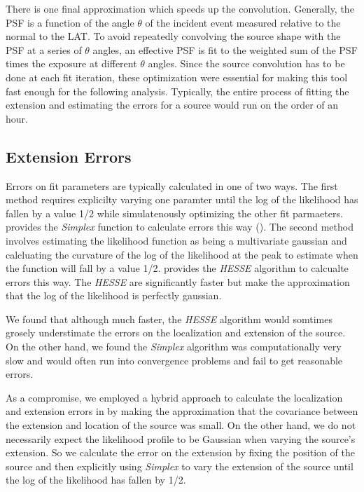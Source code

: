 \documentclass[preprint]{aastex}
\newcommand{\pointlike}{\text{\em pointlike}\xspace}
\newcommand{\minuit}{\text{\em Minuit}\xspace}
\begin{document}
There is one final approximation which speeds up the convolution.
Generally, the PSF is a function of the angle $\theta$ of the incident
event measured relative to the normal to the LAT. To avoid repeatedly
convolving the source shape with the PSF at a series of $\theta$ angles,
an effective PSF is fit to the weighted sum of the PSF times the exposure
at different $\theta$ angles.  Since the source convolution has to be
done at each fit iteration, these optimization were essential for making
this tool fast enough for the following analysis. Typically, the entire
process of fitting the extension and estimating the errors for a source
would run on the order of an hour.

\subsection{Extension Errors}

Errors on fit parameters are typically calculated in one of two ways. The
first method requires explicilty varying one paramter until the log of
the likelihood has fallen by a value 1/2 while simulatenously optimizing
the other fit parmaeters.  \minuit provides the {\em Simplex} function to
calculate errors this way (\cite{minuit_documentation}).
The second method involves estimating the likelihood function as being
a multivariate gaussian and calcluating the curvature of the log of
the likelihood at the peak to estimate when the function will fall by
a value 1/2. \minuit provides the {\em HESSE} algorithm to calcualte
errors this way.  The {\em HESSE} are significantly faster but make the
approximation that the log of the likelihood is perfectly gaussian.

We found that although much faster, the {\em HESSE} algorithm would
somtimes grosely understimate the errors on the localization and extension
of the source.  On the other hand, we found the {\em Simplex} algorithm
was computationally very slow and would often run into convergence
problems and fail to get reasonable errors.

As a compromise, we employed a hybrid approach to calculate
the localization and extension errors in \pointlike by making the
approximation that the covariance between the extension and location of
the source was small. On the other hand, we do not necessarily expect the
likelihood profile to be Gaussian when varying the source's extension.
So we calculate the error on the extension by fixing the position of the
source and then explicitly using {\em Simplex} to vary the extension of
the source until the log of the likelihood has fallen by 1/2.
\end{document}
